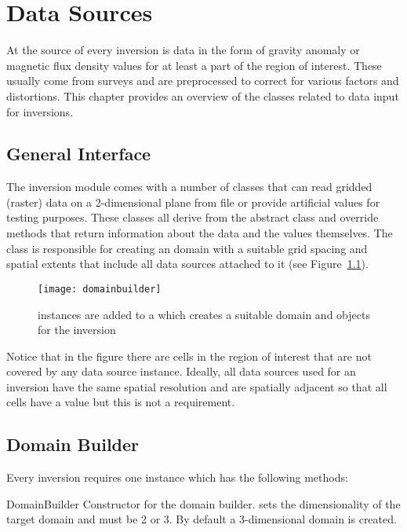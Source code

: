 \chapter{Data Sources}\label{Chp:ref:data sources}

At the source of every inversion is data in the form of gravity anomaly or
magnetic flux density values for at least a part of the region of interest.
These usually come from surveys and are preprocessed to correct for various
factors and distortions.
This chapter provides an overview of the classes related to data input for
inversions.

\section{General Interface}
The inversion module comes with a number of classes that can read gridded
(raster) data on a 2-dimensional plane from file or provide artificial values
for testing purposes. These classes all derive from the abstract
 class and override methods that return information about
the data and the values themselves.
The  class is responsible for creating an \escript domain
with a suitable grid spacing and spatial extents that include all data sources
attached to it (see Figure~\ref{fig:domainBuilder}).
%
\begin{figure}[ht]
    \centering\texttt{[image: domainbuilder]}
    \caption{ instances are added to a 
        which creates a suitable domain and \Data objects for the inversion}
    \label{fig:domainBuilder}
\end{figure}
%
Notice that in the figure there are cells in the region of interest that are
not covered by any data source instance.
Ideally, all data sources used for an inversion have the same spatial resolution
and are spatially adjacent so that all cells have a value but this is not a
requirement.


\section{Domain Builder}\label{Chp:ref:domain builder}
Every inversion requires one  instance which has the
following methods:

\begin{classdesc}{DomainBuilder}{}
Constructor for the domain builder.  sets the dimensionality of the
target domain and must be 2 or 3. By default a 3-dimensional domain is created.
\end{classdesc}

